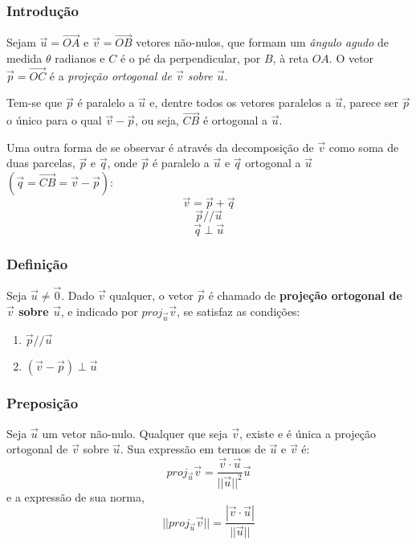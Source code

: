 \documentclass[hyperref={pdfpagelabels=false}]{beamer}
\begin{document}
\begin{frame}
	\frametitle{Introdução}


Sejam $\overrightarrow{u} = \overrightarrow{OA}$ e $\overrightarrow{v} = \overrightarrow{OB}$ vetores não-nulos, que formam um \emph{ângulo agudo} de medida $\theta$ radianos e $C$ é o pé da perpendicular, por $B$, à reta $OA$. O vetor $\overrightarrow{p} = \overrightarrow{OC}$ é a \emph{projeção ortogonal de $\overrightarrow{v}$ sobre $\overrightarrow{u}$}.

Tem-se que $\overrightarrow{p}$ é paralelo a $\overrightarrow{u}$ e, dentre todos os vetores paralelos a $\overrightarrow{u}$, parece ser $\overrightarrow{p}$ o único para o qual $\overrightarrow{v} - \overrightarrow{p}$, ou seja, $\overrightarrow{CB}$ é ortogonal a $\overrightarrow{u}$.

\pause

Uma outra forma de se observar é através da decomposição de $\overrightarrow{v}$ como soma de duas parcelas, $\overrightarrow{p}$ e $\overrightarrow{q}$, onde $\overrightarrow{p}$ é paralelo a $\overrightarrow{u}$ e $\overrightarrow{q}$ ortogonal a $\overrightarrow{u}$ $(\overrightarrow{q} = \overrightarrow{CB} = \overrightarrow{v} - \overrightarrow{p})$:
$$\overrightarrow{v} = \overrightarrow{p} + \overrightarrow{q}$$
$$\overrightarrow{p} // \overrightarrow{u}$$
$$\overrightarrow{q} \perp \overrightarrow{u}$$

\end{frame}

\begin{frame}
	\frametitle{Definição}
	
	Seja $\overrightarrow{u} \neq \overrightarrow{0}$. Dado $\overrightarrow{v}$ qualquer, o vetor $\overrightarrow{p}$ é chamado de {\bf projeção ortogonal de $\overrightarrow{v}$ sobre $\overrightarrow{u}$}, e indicado por $proj_{\overrightarrow{u}}\overrightarrow{v}$, se satisfaz as condições:
	\begin{enumerate}
		\item $\overrightarrow{p}//\overrightarrow{u}$
		\item $(\overrightarrow{v} - \overrightarrow{p})\perp\overrightarrow{u}$
	\end{enumerate}
	
\end{frame}


\begin{frame}
	\frametitle{Preposição}
	
	Seja $\overrightarrow{u}$ um vetor não-nulo. Qualquer que seja $\overrightarrow{v}$, existe e é única a projeção ortogonal de $\overrightarrow{v}$ sobre $\overrightarrow{u}$. Sua expressão em termos de $\overrightarrow{u}$ e $\overrightarrow{v}$ é:
	$$proj_{\overrightarrow{u}}\overrightarrow{v} = \frac{\overrightarrow{v}\cdot \overrightarrow{u}}{||\overrightarrow{u}||^2}\overrightarrow{u}$$
	e a expressão de sua norma,
	$$||proj_{\overrightarrow{u}}\overrightarrow{v}|| = \frac{|\overrightarrow{v}\cdot \overrightarrow{u}|}{||\overrightarrow{u}||}$$
	
	
\end{frame}
\end{document}
